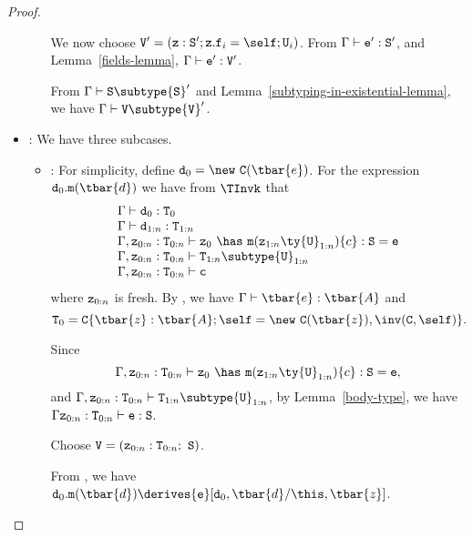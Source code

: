 \begin{proof}
\begin{itemize}
\begin{itemize}
{             We now choose 
             ${\tt V'} = ({\tt z}: {\tt S}'; {\tt z}.{\tt f}_i=\self;{\tt U}_i)$.
             From $\Gamma \vdash {\tt e}': {\tt S}'$, and
             Lemma~\ref{fields-lemma},
             $\Gamma \vdash {\tt e}' : {\tt V}'$.

             From $\Gamma \vdash {\tt S} \subtype {\tt S}'$ and 
             Lemma~\ref{subtyping-in-existential-lemma}, we have $\Gamma \vdash {\tt V} \subtype {\tt V}'$.
             }
   \end{itemize}
\item
\TInvk: We have three subcases.
   \begin{itemize}
   \item
   \RInvk:  
            For simplicity, define ${\tt d}_0 = \new\ {\tt C}(\tbar{e})$.
            For the expression 
            ${\tt d}_0.{\tt m}(\tbar{d})$
            we have from $\TInvk$ that
            $$
            \begin{array}{l}
            \Gamma \vdash {\tt d}_0: {\tt T}_0 \\
            \Gamma \vdash {\tt d}_{1:n}: {\tt T}_{1:n} \\
            \Gamma, {\tt z}_{0:n}: {\tt T}_{0:n} \vdash {\tt z}_0\ \has\ {\tt m}({\tt z}_{1:n} \ty {\tt U}_{1:n})\{c\}: {\tt S} = {\tt e} \\
            \Gamma, {\tt z}_{0:n}: {\tt T}_{0:n} \vdash {\tt T}_{1:n} \subtype {\tt U}_{1:n} \\
            \Gamma, {\tt z}_{0:n}: {\tt T}_{0:n} \vdash {\tt c} \\
            \end{array}
            $$
            \noindent
            where ${\tt z}_{0:n}$ is fresh.  By \TNew, we have
            $\Gamma \vdash \tbar{e}: \tbar{A}$
            and
            $${\tt T}_0 = {\tt C}\{\tbar{z}: \tbar{A}; \self = \new\ {\tt C}(\tbar{z}), \inv({\tt C},\self)\}.$$

            Since
            $$\Gamma, {\tt z}_{0:n}: {\tt T}_{0:n} \vdash {\tt z}_0\ \has\ {\tt m}({\tt z}_{1:n} \ty {\tt U}_{1:n})\{c\}: {\tt S} = {\tt e},$$
            and 
            $\Gamma, {\tt z}_{0:n}: {\tt T}_{0:n} \vdash {\tt T}_{1:n} \subtype {\tt U}_{1:n}$,
            by Lemma~\ref{body-type}, we have
            $\Gamma {\tt z}_{0:n}: {\tt T}_{0:n} \vdash {\tt e}: {\tt S}$.

            Choose ${\tt V} = ({\tt z}_{0:n}: {\tt T}_{0:n};\ {\tt S})$.

            From \RInvk, we have
            ${\tt d}_0.{\tt m}(\tbar{d}) \derives {\tt e}[{\tt d}_0,\tbar{d}/\this,\tbar{z}]$.


\end{itemize}
\end{itemize}
\end{proof}
